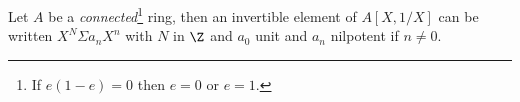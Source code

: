 




 \begin{lemma}\label{stand}
   Let $A$ be a \emph{connected}\footnote{If $e(1-e) = 0$ then $e=0$ or $e=1$.} ring, then
   an invertible element of $A[X,1/X]$ can be written $X^N\Sigma a_nX^n$ with $N$ in $\Z$
   and $a_0$ unit and $a_n$ nilpotent if $n\neq 0$.
 \end{lemma}

